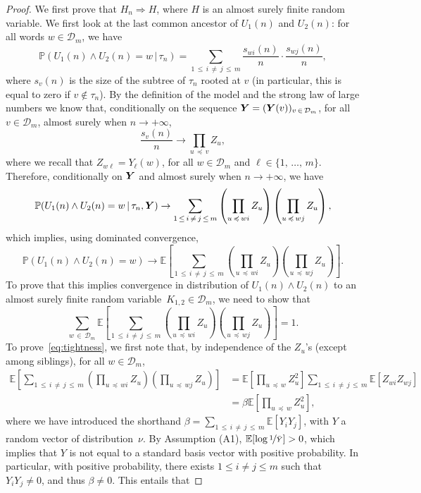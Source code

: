 \documentclass[10pt]{amsart}
\theoremstyle{definition}\newtheorem{defi}[theo]{Definition}\newtheorem{rema}[theo]{Remark}\newtheorem{exam}[theo]{Example}\newtheorem{exem}[theo]{Example}\newtheorem{nota}[theo]{Notation}
\newcommand{\bs}{\ensuremath{\boldsymbol}}
\newcommand{\bbP}{\mathbb{P}}
\newcommand{\bbE}{\mathbb{E}}
\newcommand{\clD}{\mathcal{D}}
\begin{document}
\begin{proof}
{We first prove that $H_n\Rightarrow H$}, where $H$ is an almost surely finite random variable. We first look at the last common ancestor of $U_1(n)$ and $U_2(n)$: for all words $w\in\clD_m$, we have
\[
\bbP(U_1(n)\wedge U_2(n) = w\, |\, \tau_n) = \sum_{1\,\leq\,i\,\neq\,j\,\leq\,m} \frac{s_{wi}(n)}n\cdot \frac{s_{wj}(n)}n,
\]
where $s_v(n)$ is the size of the subtree of $\tau_n$ rooted at $v$ (in particular, this is equal to zero if $v\notin\tau_n$). By the definition of the model and the strong law of large numbers we know that, conditionally on the sequence $\bs Y = (\bs Y(v))_{v\,\in\,\clD_m}$, for all $v\in\clD_m$, almost surely when $n\to+\infty$,
\[
\frac{s_{v}(n)}n \to \prod_{u\,\preccurlyeq\,v} Z_u,
\]
where we recall that $Z_{w\ell} = Y_\ell(w)$, for all $w\in\clD_m$ and $\ell\in\{1,\,\ldots,\,m\}$. Therefore, conditionally on $\bs Y$ and almost surely when $n\to+\infty$, we have
\[
\bbP(U_1(n)\wedge U_2(n) = w\, |\, \tau_n, \bs Y)
\to \sum_{1\,\leq\,i\,\neq\,j\,\leq\,m} \left(\prod_{u\,\preccurlyeq \,wi}Z_u\right) \left(\prod_{u\,\preccurlyeq\,wj}Z_u\right),
\]
which implies, using dominated convergence,
\[
\bbP(U_1(n)\wedge U_2(n) = w)
\to \bbE\left[\sum_{1\,\leq\,i\,\neq\,j\,\leq\,m} \left(\prod_{u\,\preccurlyeq\,wi}Z_u\right) \left(\prod_{u\,\preccurlyeq\,wj}Z_u\right)\right].
\]
To prove that this implies convergence in distribution of $U_1(n)\wedge U_2(n)$ to an almost surely finite random variable~$K_{1,2}\in\clD_m$, we need to show that
\begin{equation}\label{eq:tightness}
\sum_{w\,\in\,\clD_m}
\bbE\left[\sum_{1\,\leq\,i\,\neq\,j\,\leq\,m} \left(\prod_{u\,\preccurlyeq\,wi}Z_u\right) \left(\prod_{u\,\preccurlyeq\,wj}Z_u\right)\right] = 1.
\end{equation}
To prove~\eqref{eq:tightness}, we first note that, by independence of the $Z_u$'s (except among siblings), for all $w\in\clD_m$,
\begin{align*}
\bbE\left[\sum_{1\,\leq\,i\,\neq\,j\,\leq\,m} \left(\prod_{u\,\preccurlyeq\,wi}Z_u\right) \left(\prod_{u\,\preccurlyeq\,wj}Z_u\right)\right] &= \bbE\left[\prod_{u\,\preccurlyeq\,w}Z^2_u\right]
\sum_{1\,\leq\,i\,\neq\,j\,\leq\,m} \bbE\left[Z_{wi}Z_{wj}\right]\\
&= \beta\bbE\left[\prod_{u\,\preccurlyeq\,w}Z^2_u\right],
\end{align*}
where we have introduced the shorthand $\beta = \sum_{1\,\leq\,i\,\neq\, j\,\leq\,m} \bbE[Y_i Y_j]$, with $Y$ a random vector of distribution~$\nu$. By Assumption (A1), $\bbE[\log \nicefrac1{\bar Y}]>0$, which implies that $Y$ is not equal to a standard basis vector with positive probability. In particular, with positive probability, there exists $1\leq i\neq j\leq m$ such that $Y_iY_j\neq 0$, and thus $\beta\neq 0$. This entails that

\end{proof}
\end{document}
